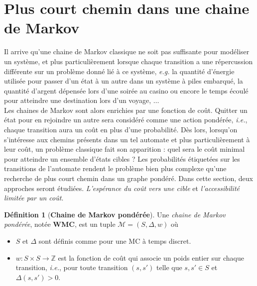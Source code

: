 \documentclass[12pt,a4paper]{report}
\theoremstyle{definition}%
\newtheorem{definition}{Définition}[chapter]
\theoremstyle{remark}
\newcommand{\eg}{\textit{e.g.} }
\newcommand{\ie}{\textit{i.e.}, }
\let\labelitemi\labelitemii
\begin{document}
\section{Plus court chemin dans une chaine de Markov}
Il arrive qu'une chaine de Markov classique ne soit pas suffisante pour modéliser un système, et plus particulièrement lorsque chaque transition a une répercussion différente sur un problème donné lié à ce système, \eg la quantité d'énergie utilisée pour passer d'un état à un autre dans un système à piles embarqué, la quantité d'argent dépensée lors d'une soirée au casino ou encore le temps écoulé pour atteindre une destination lors d'un voyage, $\dots$ \\
Les chaines de Markov sont alors enrichies par une fonction de coût. Quitter un état pour en rejoindre un autre sera considéré comme une action pondérée, \ie chaque transition aura un coût en plus d'une probabilité. Dès lors, lorsqu'on s'intéresse aux chemins présents dans un tel automate et plus particulièrement à leur coût, un problème classique fait son apparition : quel sera le coût minimal pour atteindre un ensemble d'états cibles ? Les probabilités étiquetées sur les transitions de l'automate rendent le problème bien plus complexe qu'une recherche de plus court chemin dans un graphe pondéré. Dans cette section, deux approches seront étudiées. \textit{L'espérance du coût vers une cible} et \textit{l'accessibilité limitée par un coût}.

\begin{definition}[\textbf{Chaine de Markov pondérée}]
	Une \textit{chaine de Markov pondérée}, notée \textbf{WMC}, est un tuple $\mathcal{M} = (S, \Delta, w)$ où
	\begin{itemize}
		\renewcommand{\labelitemi}{\tiny$\bullet$}
		\item $S$ et $\Delta$ sont définis comme pour une MC à temps discret.
		\item $w: S\times S \rightarrow \mathbb{Z}$ est la fonction de coût qui associe un poids entier sur chaque  transition, \ie pour toute transition $(s, s')$ telle que $s, s' \in S$ et $\Delta(s, s') > 0$.
	\end{itemize}
\end{definition}
\end{document}
